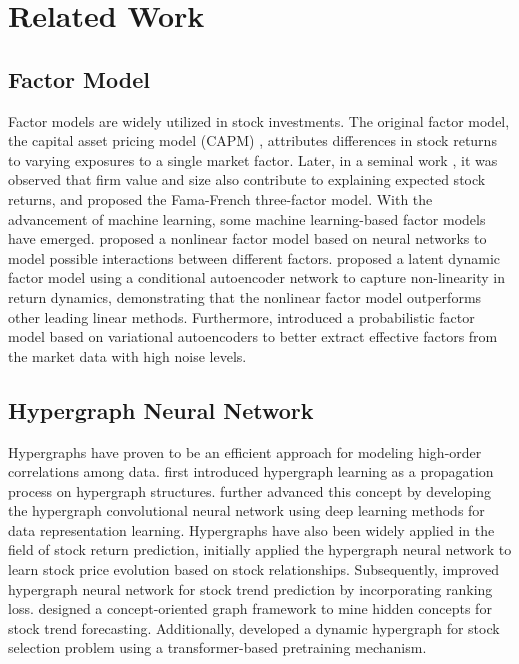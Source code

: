 \section{Related Work}
\subsection{Factor Model}
Factor models are widely utilized in stock investments. The original factor model, the capital asset pricing model (CAPM) \cite{treynor1961toward, sharpe1964capital, lintner1975valuation}, attributes differences in stock returns to varying exposures to a single market factor. Later, in a seminal work \cite{eugene1992cross}, it was observed that firm value and size also contribute to explaining expected stock returns, and proposed the Fama-French three-factor model.
With the advancement of machine learning, some machine learning-based factor models have emerged. \cite{levin1995stock} proposed a nonlinear factor model based on neural networks to model possible interactions between different factors. \cite{gu2021autoencoder} proposed a latent dynamic factor model using a conditional autoencoder network to capture non-linearity in return dynamics, demonstrating that the nonlinear factor model outperforms other leading linear methods. Furthermore, \cite{duan2022factorvae} introduced a probabilistic factor model based on variational autoencoders to better extract effective factors from the market data with high noise levels.

\subsection{Hypergraph Neural Network}
Hypergraphs have proven to be an efficient approach for modeling high-order correlations among data. \cite{zhou2006learning} first introduced hypergraph learning as a propagation process on hypergraph structures. \cite{feng2019hypergraph} further advanced this concept by developing the hypergraph convolutional neural network using deep learning methods for data representation learning. Hypergraphs have also been widely applied in the field of stock return prediction\cite{li2022hypergraph, han2023stock, su2024attention}, \cite{sawhney2020spatiotemporal} initially applied the hypergraph neural network to learn stock price evolution based on stock relationships. Subsequently, \cite{sawhney2021stock} improved hypergraph neural network for stock trend prediction by incorporating ranking loss. \cite{xu2021hist} designed a concept-oriented graph framework to mine hidden concepts for stock trend forecasting. Additionally, \cite{xia2024ci} developed a dynamic hypergraph for stock selection problem using a transformer-based pretraining mechanism.

